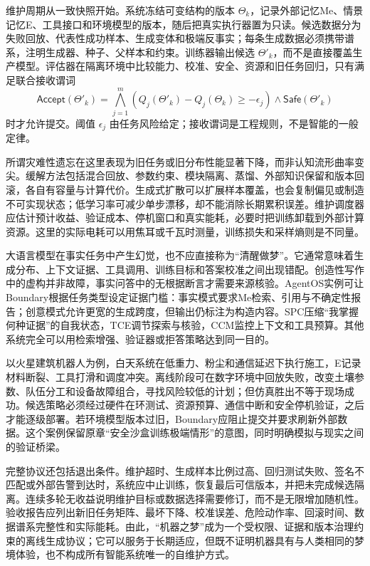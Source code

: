 维护周期从一致快照开始。系统冻结可变结构的版本 $\Theta_k$，记录外部记忆Me、情景记忆E、工具接口和环境模型的版本，随后把真实执行器置为只读。候选数据分为失败回放、代表性成功样本、生成变体和极端反事实；每条生成数据必须携带谱系，注明生成器、种子、父样本和约束。训练器输出候选 $\Theta'_k$，而不是直接覆盖生产模型。评估器在隔离环境中比较能力、校准、安全、资源和旧任务回归，只有满足联合接收谓词
\[
\mathsf{Accept}(\Theta'_k)=
\bigwedge_{j=1}^{m}\left(Q_j(\Theta'_k)-Q_j(\Theta_k)\ge -\epsilon_j\right)
\land \mathsf{Safe}(\Theta'_k)
\]
时才允许提交。阈值 $\epsilon_j$ 由任务风险给定；接收谓词是工程规则，不是智能的一般定律。

所谓灾难性遗忘在这里表现为旧任务或旧分布性能显著下降，而非认知流形曲率变尖。缓解方法包括混合回放、参数约束、模块隔离、蒸馏、外部知识保留和版本回滚，各自有容量与计算代价。生成式扩散可以扩展样本覆盖，也会复制偏见或制造不可实现状态；低学习率可减少单步漂移，却不能消除长期累积误差。维护调度器应估计预计收益、验证成本、停机窗口和真实能耗，必要时把训练卸载到外部计算资源。这里的实际电耗可以用焦耳或千瓦时测量，训练损失和采样熵则是不同量。

大语言模型在事实任务中产生幻觉，也不应直接称为“清醒做梦”。它通常意味着生成分布、上下文证据、工具调用、训练目标和答案校准之间出现错配。创造性写作中的虚构并非故障，事实问答中的无根据断言才需要来源核验。AgentOS实例可让Boundary根据任务类型设定证据门槛：事实模式要求Me检索、引用与不确定性报告；创意模式允许更宽的生成跨度，但输出仍标注为构造内容。SPC压缩“我掌握何种证据”的自我状态，TCE调节探索与核验，CCM监控上下文和工具预算。其他系统完全可以用检索增强、验证器或拒答策略达到同一目的。

以火星建筑机器人为例，白天系统在低重力、粉尘和通信延迟下执行施工，E记录材料断裂、工具打滑和调度冲突。离线阶段可在数字环境中回放失败，改变土壤参数、队伍分工和设备故障组合，寻找风险较低的计划；但仿真胜出不等于现场成功。候选策略必须经过硬件在环测试、资源预算、通信中断和安全停机验证，之后才能逐级部署。若环境模型版本过旧，Boundary应阻止提交并要求刷新外部数据。这个案例保留原章“安全沙盒训练极端情形”的意图，同时明确模拟与现实之间的验证桥梁。

完整协议还包括退出条件。维护超时、生成样本比例过高、回归测试失败、签名不匹配或外部告警到达时，系统应中止训练，恢复最后可信版本，并把未完成候选隔离。连续多轮无收益说明维护目标或数据选择需要修订，而不是无限增加随机性。验收报告应列出新旧任务矩阵、最坏下降、校准误差、危险动作率、回滚时间、数据谱系完整性和实际能耗。由此，“机器之梦”成为一个受权限、证据和版本治理约束的离线生成协议；它可以服务于长期适应，但既不证明机器具有与人类相同的梦境体验，也不构成所有智能系统唯一的自维护方式。
